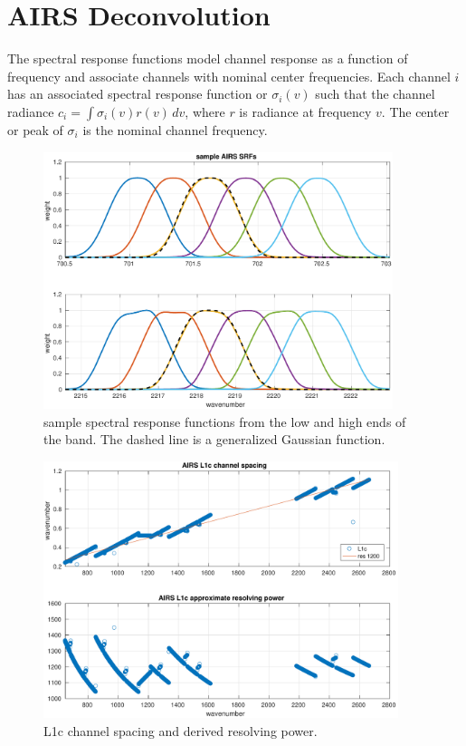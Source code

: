 \documentclass[11pt]{article}
\begin{document}
\FloatBarrier
\section{AIRS Deconvolution}
\label{decon}

The {\airs} spectral response functions model channel response as a
function of frequency and associate channels with nominal center
frequencies.  Each {\airs} channel $i$ has an associated spectral
response function or {\srf} $\sigma_i(v)$ such that the channel
radiance $c_i = \int \sigma_i(v)r(v)\,dv$, where $r$ is radiance at
frequency $v$.  The center or peak of $\sigma_i$ is the nominal
channel frequency.

\begin{figure} %
  \centering
  \includegraphics[height=7.5cm]{figures/airs_sample_srfs.pdf}
  \caption{sample {\airs} spectral response functions from the low
    and high ends of the band.   The dashed line is a generalized
    Gaussian function.}
  \label{srfs1}
\end{figure}

\begin{figure} %
  \centering
  \includegraphics[height=7.5cm]{figures/airs_L1c_res.pdf}
  \caption{{\airs} L1c channel spacing and derived resolving
    power.}
  \label{chan1}
\end{figure}
\end{document}
